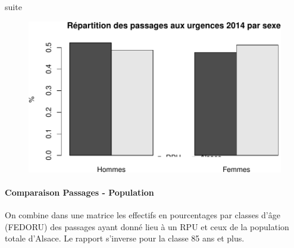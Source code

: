 \documentclass[]{article}
\newenvironment{Shaded}{\begin{snugshade}}{\end{snugshade}}
\newcommand{\KeywordTok}[1]{\textcolor[rgb]{0.13,0.29,0.53}{\textbf{{#1}}}}
\newcommand{\DataTypeTok}[1]{\textcolor[rgb]{0.13,0.29,0.53}{{#1}}}
\newcommand{\DecValTok}[1]{\textcolor[rgb]{0.00,0.00,0.81}{{#1}}}
\newcommand{\FloatTok}[1]{\textcolor[rgb]{0.00,0.00,0.81}{{#1}}}
\newcommand{\StringTok}[1]{\textcolor[rgb]{0.31,0.60,0.02}{{#1}}}
\newcommand{\OtherTok}[1]{\textcolor[rgb]{0.56,0.35,0.01}{{#1}}}
\newcommand{\NormalTok}[1]{{#1}}
\begin{document}
suite

\begin{Shaded}
\end{Shaded}

\begin{figure}[htbp]
\centering
\includegraphics{age_files/figure-latex/unnamed-chunk-2-1.pdf}
\end{figure}

\paragraph{Comparaison Passages -
Population}\label{comparaison-passages---population}

On combine dans une matrice les effectifs en pourcentages par classes
d'âge (FEDORU) des passages ayant donné lieu à un RPU et ceux de la
population totale d'Alsace. Le rapport s'inverse pour la classe 85 ans
et plus.
\end{document}
